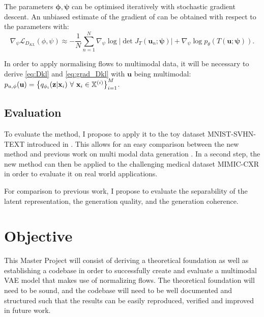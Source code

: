 \documentclass[english]{scrartcl}
\begin{document}
    The parameters $\boldsymbol{\phi}, \boldsymbol{\psi}$ can be optimised iteratively with stochastic gradient descent.
    An unbiased estimate of the gradient of  can be obtained with respect to the parameters with:
    \begin{equation}\label{eq:grad_Dkl}
        \nabla _{\psi} \mathcal{L}_{D_{KL}}(\phi, \psi) \approx - \frac{1}{N} \sum ^N _{n=1}   \nabla _{\psi}\log |\det J_{T}(\textbf{u}_n; \boldsymbol{\psi})| + \nabla _{\psi} \log p_{\theta}(T(\textbf{u}; \boldsymbol{\psi})).
    \end{equation}
    
    In order to apply normalising flows to multimodal data, it will be necessary to derive \cref{eq:Dkl} and \cref{eq:grad_Dkl} with $\textbf{u}$ being multimodal: $p_{u,\phi}(\textbf{u}) = \left\{ q_{\phi _i}(\textbf{z}|\textbf{x}_i)\ \forall\ \textbf{x}_i \in \mathbb{X}^{(i)} \right\}_{i=1}^M$.

    \subsection{Evaluation}
    To evaluate the method, I propose to apply it to the toy dataset MNIST-SVHN-TEXT introduced in \citet{sutter_generalized_2020}.
    This allows for an easy comparison between the new method and previous work on multi modal data generation \citep[MoPoE, MoE, PoE][]{sutter_generalized_2020, shi_variational_2019, wu_multimodal_2018}.
    In a second step, the new method can then be applied to the challenging medical dataset MIMIC-CXR \citep{johnson_mimic-cxr-jpg_2019} in order to evaluate it on real world applications.

    For comparison to previous work, I propose to evaluate the separability of the latent representation, the generation quality, and the generation coherence.


    \section{Objective}
    This Master Project will consist of deriving a theoretical foundation as well as establishing a codebase in order to successfully create and evaluate a multimodal VAE model that makes use of normalizing flows.
    The theoretical foundation will need to be sound, and the codebase will need to be well documented and structured such that the results can be easily reproduced, verified and improved in future work.

    \newpage
    \printbibliography
\end{document}
